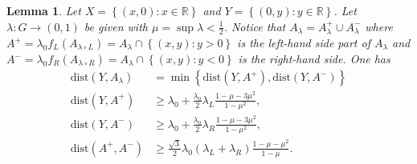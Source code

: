 \documentclass{amsart}
\newcommand{\RR}{\mathbb R}
\newcommand{\ENCLOSE}[1]{\left\{#1\right\}}
\newcommand{\dist}{\mathrm{dist}}
\newtheorem{lemma}[theorem]{Lemma}
\theoremstyle{definition}
\theoremstyle{remark}
\begin{document}
{\begin{lemma}\label{lm:precedente1}
  Let $X=\ENCLOSE{(x,0)\colon x\in \RR}$ and $Y=\ENCLOSE{(0,y)\colon y\in \RR}$.
  Let $\lambda\colon G\to (0,1)$ be given with $\mu=\sup \lambda <\frac 1 2$.
  Notice that $A_\lambda = A_\lambda^+ \cup A_\lambda^-$ where 
  $A^+ = \lambda_0 f_L(A_{\lambda\circ L}) = A_\lambda \cap \ENCLOSE{(x,y)\colon y>0}$ 
  is the left-hand side 
  part of $A_\lambda$
  and $A^- = \lambda_0 f_R(A_{\lambda\circ R}) = A_\lambda \cap\ENCLOSE{(x,y)\colon y<0}$ 
  is the right-hand side.
  One has
  \begin{align*}
      \dist(Y,A_\lambda) 
      &= \min \ENCLOSE{\dist(Y,A^+),\dist(Y,A^-)}\\
      \dist(Y,A^+)
      & \ge \lambda_0 + \frac{\lambda_0}{2} \lambda_L\frac{1-\mu-3\mu^2}{1-\mu^2}, \\
      \dist(Y,A^-)
      & \ge \lambda_0 + \frac{\lambda_0}{2} \lambda_R\frac{1-\mu-3\mu^2}{1-\mu^2}, \\
      \dist(A^+,A^-) &\ge 
      \frac{\sqrt 3}{2} \lambda_0(\lambda_L+\lambda_R)\frac{1-\mu-\mu^2}{1-\mu}.
  \end{align*}
  \end{lemma}  
}
\end{document}
